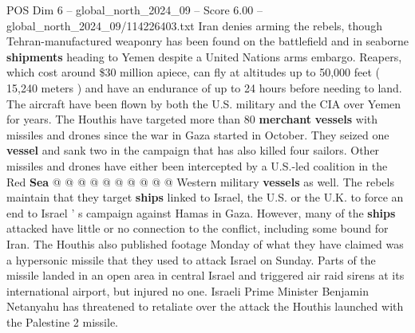 \begin{textsample}{POS Dim 6 – global\_north\_2024\_09 – Score 6.00 – global\_north\_2024\_09/114226403.txt}
Iran denies arming the rebels, though Tehran-manufactured weaponry has been found on the battlefield and in seaborne \textbf{shipments} heading to Yemen despite a United Nations arms embargo.
Reapers, which cost around \$30 million apiece, can fly at altitudes up to 50,000 feet ( 15,240 meters ) and have an endurance of up to 24 hours before needing to land.
The aircraft have been flown by both the U.S. military and the CIA over Yemen for years.
The Houthis have targeted more than 80 \textbf{merchant} \textbf{vessels} with missiles and drones since the war in Gaza started in October.
They seized one \textbf{vessel} and sank two in the campaign that has also killed four sailors.
Other missiles and drones have either been intercepted by a U.S.-led coalition in the Red \textbf{Sea} @ @ @ @ @ @ @ @ @ @ Western military \textbf{vessels} as well.
The rebels maintain that they target \textbf{ships} linked to Israel, the U.S. or the U.K. to force an end to Israel ' s campaign against Hamas in Gaza.
However, many of the \textbf{ships} attacked have little or no connection to the conflict, including some bound for Iran.
The Houthis also published footage Monday of what they have claimed was a hypersonic missile that they used to attack Israel on Sunday.
Parts of the missile landed in an open area in central Israel and triggered air raid sirens at its international airport, but injured no one.
Israeli Prime Minister Benjamin Netanyahu has threatened to retaliate over the attack the Houthis launched with the Palestine 2 missile.

\end{textsample}
